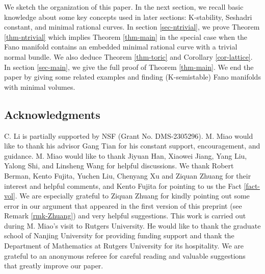 \documentclass[12pt]{amsart}
\theoremstyle{definition}
\newcommand{\IP}{{\mathbb P}}
\begin{document}


We sketch the organization of this paper. In the next section, we recall basic knowledge about some key concepts used in later sections: K-stability, Seshadri constant, and minimal rational curves. In section \ref{sec-ntrivial}, we prove Theorem \ref{thm-ntrivial} which implies Theorem \ref{thm-main} in the special case when the Fano manifold contains an embedded minimal rational curve with a trivial normal bundle. We also deduce Theorem \ref{thm-toric} and Corollary \ref{cor-lattice}. In section \ref{sec-main}, we give the full proof of Theorem \ref{thm-main}. We end the paper by giving some related examples and finding (K-semistable) Fano manifolds with minimal volumes. 

\subsection*{Acknowledgments}
C. Li is partially supported by NSF (Grant No. DMS-2305296). M. Miao would like to thank his advisor Gang Tian for his constant support, encouragement, and guidance. M. Miao would like to thank Jiyuan Han, Xiaowei Jiang, Yang Liu, Yalong Shi, and Linsheng Wang for helpful discussions. We thank Robert Berman, Kento Fujita, Yuchen Liu,  Chenyang Xu and Ziquan Zhuang for their interest and helpful comments, and Kento Fujita for pointing to us the Fact \ref{fact-vol}. We are especially grateful to Ziquan Zhuang for kindly pointing out some error in our argument that appeared in the first version of this preprint (see Remark \ref{rmk-Zhuang}) and very helpful suggestions. 
This work is carried out during M. Miao's visit to Rutgers University. He would like to thank the graduate school of Nanjing University for providing funding support and thank the Department of Mathematics at Rutgers University for its hospitality. We are grateful to an anonymous referee for careful reading and valuable suggestions that greatly improve our paper. 


\end{document}
